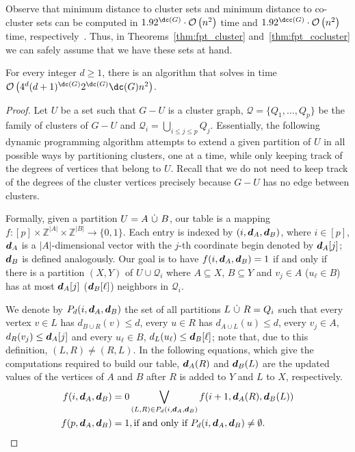 Observe that minimum distance to cluster
sets and minimum distance to co-cluster sets can be computed in $1.92^{\dc( G )} \cdot \bigO{ n^2 }$
time and $1.92^{\dcc( G )} \cdot \bigO{n^2 }$ time, respectively~\cite{branching-cluster}. Thus, in Theorems~\ref{thm:fpt_cluster} and~\ref{thm:fpt_cocluster} we can safely assume that we have these sets at hand.


\begin{theorem}
    \label{thm:fpt_cluster}
    For every integer $d \geq 1$, there is an algorithm that solves  in time $\bigO{4^d(d+1)^{\dc(G)}2^{\dc(G)}\dc(G)n^2}$.
\end{theorem}

\begin{proof}
    Let $U$ be a set such that $G - U$ is a cluster graph, $\mathcal{Q} = \{Q_1, \dots, Q_p\}$ be the family of clusters of $G - U$ and $\mathcal{Q}_i = \bigcup_{i \leq j \leq p} Q_j$.
    Essentially, the following dynamic programming algorithm attempts to extend a given partition of $U$ in all possible ways by partitioning clusters, one at a time, while only keeping track of the degrees of vertices that belong to $U$.
    Recall that we do not need to keep track of the degrees of the cluster vertices precisely because $G - U$ has no edge between clusters.

    Formally, given a partition $U = A  \ \dot\cup\  B$, our table is a mapping $f : [p] \times \mathbb{Z}^{|A|} \times \mathbb{Z}^{|B|} \rightarrow \{0, 1\}$.
    Each entry is indexed by $(i, \boldsymbol{d}_A, \boldsymbol{d}_B)$, where $i \in [p]$, $\boldsymbol{d}_A$ is a $|A|$-dimensional vector with the $j$-th coordinate begin denoted by $\boldsymbol{d}_A[j]$; $\boldsymbol{d}_B$ is defined analogously.
    Our goal is to have $f(i, \boldsymbol{d}_A, \boldsymbol{d}_B) = 1$ if and only if there is a partition $(X, Y)$ of $U \cup \mathcal{Q}_i$ where $A \subseteq X$, $B \subseteq Y$ and $v_j \in A$ ($u_{\ell} \in B$) has at most $\boldsymbol{d}_A[j]$ ($\boldsymbol{d}_B[\ell]$) neighbors in $\mathcal{Q}_i$.

    We denote by $P_d(i, \boldsymbol{d}_A, \boldsymbol{d}_B)$ the set of all partitions $L  \ \dot\cup\  R = Q_i$ such that every vertex $v \in L$ has $d_{B \cup R}(v) \leq d$, every $u \in R$ has $d_{A \cup L}(u) \leq d$, every $v_j \in A$, $d_R(v_j) \leq \boldsymbol{d}_A[j]$ and every $u_{\ell} \in B$, $d_L(u_{\ell}) \leq \boldsymbol{d}_B[\ell]$; note that, due to this definition, $(L, R) \neq (R, L)$.
    In the following equations, which give the computations required to build our table, $\boldsymbol{d}_A(R)$ and $\boldsymbol{d}_B(L)$ are the updated values of the vertices of $A$ and $B$ after $R$ is added to $Y$ and $L$ to $X$, respectively.
    \begin{align}
        f(i, \boldsymbol{d}_A, \boldsymbol{d}_B) &= 0 \bigvee_{(L, R) \in P_d(i, \boldsymbol{d}_A, \boldsymbol{d}_B)} f(i+1,\boldsymbol{d}_A(R), \boldsymbol{d}_B(L))\label{eq:trans_dc}\\
        f(p, \boldsymbol{d}_A, \boldsymbol{d}_B) &= 1, \text{if and only if $P_d(i, \boldsymbol{d}_A, \boldsymbol{d}_B) \neq \emptyset$.}\label{eq:stop_dc}
    \end{align}


\end{proof}
